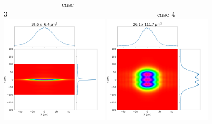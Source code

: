 \documentclass[]{article}
\begin{document}
\begin{figure}
    ~~~~~~~~~~~~~~~~~case 3~~~~~~~~~~~~~~~~~~~~~~~~~~~~~~~~~~~~~~~~~~~~case 4\\
    \includegraphics[width=0.49\textwidth]{figures/case3_comsyl.png}
    \includegraphics[width=0.49\textwidth]{figures/case4_comsyl.png}
\end{figure}

\end{document}
